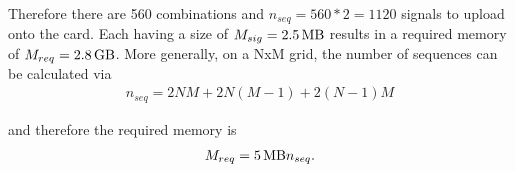 Therefore there are 560 combinations and $n_{seq} = 560*2=1120$ signals to upload onto the card. Each having a size of $M_{sig} = \SI{2.5}{\mega\byte}$ results in a required memory of $M_{req}=\SI{2.8}{\giga\byte}$. More generally, on a NxM grid, the number of sequences can be calculated via
\begin{align}
	n_{seq} = 2 N M + 2 N (M-1) + 2 (N-1) M
\end{align}

and therefore the required memory is
\begin{align}
	M_{req} = \SI{5}{\mega\byte} n_{seq}.
\end{align}

